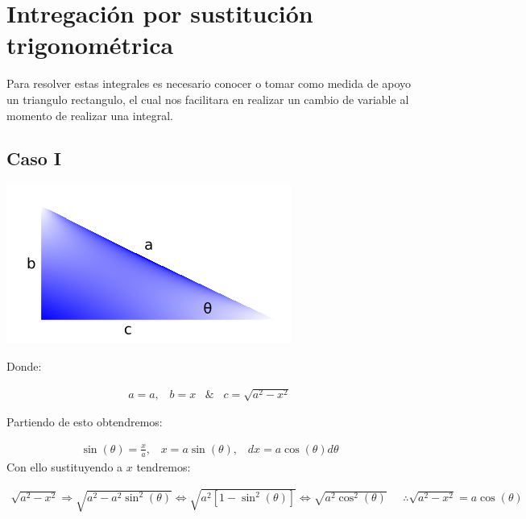 \section{Intregación por sustitución trigonométrica}
Para resolver estas integrales es necesario conocer o tomar como medida de apoyo un triangulo rectangulo, el cual nos facilitara en realizar un cambio de variable al momento de realizar una integral.\\

\subsection{Caso I}

\begin{center}
  \includegraphics[scale=0.5]{imgsAux/triangulo.png}\\
\end{center}

Donde:

\begin{equation*}
    \begin{gathered}
        a=a, \;\;\; b=x \;\;\;\&\;\;\; c=\sqrt{a^{2}-x^{2}}
    \end{gathered}
\end{equation*}

Partiendo de esto obtendremos:

\begin{equation*}
    \begin{gathered}
        \sin(\theta)= \frac{x}{a},\;\;\; x=a\sin(\theta),\;\;\; dx=a\cos(\theta)d\theta
    \end{gathered}
\end{equation*}
Con ello sustituyendo a \(\displaystyle x\) tendremos:

\begin{equation*}
    \begin{gathered}
        \sqrt{a^{2}-x^{2}}\Rightarrow \sqrt{a^{2}-a^{2}\sin^{2}(\theta)} \Leftrightarrow \sqrt{a^{2}[1-\sin^{2}(\theta)]} \Leftrightarrow \sqrt{a^{2}\cos^{2}(\theta)}\;\;\;\;\; \therefore \sqrt{a^{2}-x^{2}}=a\cos(\theta)
    \end{gathered}
\end{equation*}


